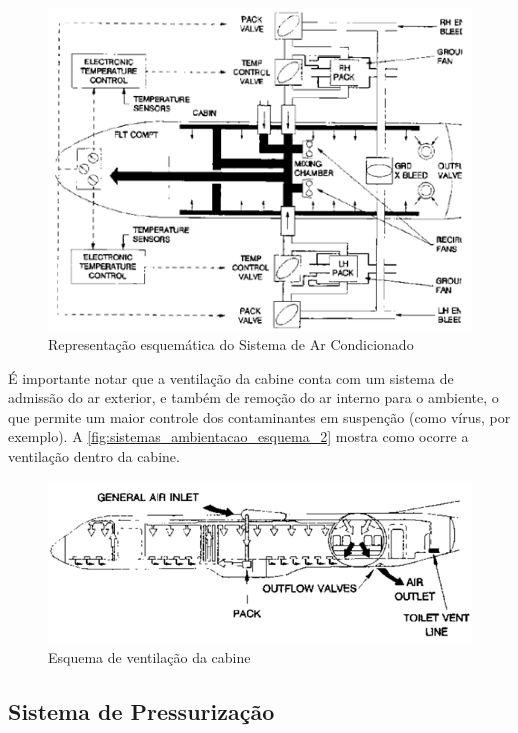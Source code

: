 \begin{figure}
\includegraphics[width=\textwidth]{images/parte3/sistemas_ambientacao_esquema.png}
\caption{Representação esquemática do Sistema de Ar Condicionado}
\label{fig:sistemas_ambientacao_esquema}
\end{figure}

É importante notar que a ventilação da cabine conta com um sistema de admissão do ar exterior, e também de remoção do ar interno para o ambiente, o que permite um maior controle dos contaminantes em suspenção (como vírus, por exemplo).
A \autoref{fig:sistemas_ambientacao_esquema_2} mostra como ocorre a ventilação dentro da cabine.

\begin{figure}
\includegraphics[width=\textwidth]{images/parte3/sistemas_ambientacao_esquema_2.png}
\caption{Esquema de ventilação da cabine}
\label{fig:sistemas_ambientacao_esquema_2}
\end{figure}

\subsection{Sistema de Pressurização}

